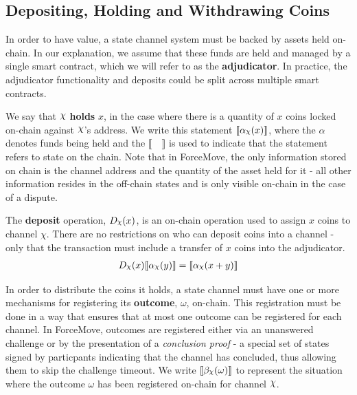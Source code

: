 \documentclass{article}
\DeclareRobustCommand{\rchi}{{\mathpalette\irchi\relax}}
\newcommand{\irchi}[2]{\raisebox{\depth}{$#1\chi$}} %
\theoremstyle{definition}
\newcommand{\adj}[1]{\llbracket #1 \rrbracket}
\begin{document}
\subsection{Depositing, Holding and Withdrawing Coins}

In order to have value, a state channel system must be backed by assets held on-chain.
In our explanation, we assume that these funds are held and managed by a single smart contract,
which we will refer to as the \textbf{adjudicator}.
In practice, the adjudicator functionality and deposits could be split across multiple smart contracts.

We say that $\rchi$ \textbf{holds} $x$, in the case where there is a quantity of $x$ coins
locked on-chain against $\rchi$'s address.
We write this statement $\adj{\alpha_\rchi(x)}$, where the $\alpha$ denotes funds being held
and the $\adj{\quad}$ is used to indicate that the statement refers to state on the chain.
Note that in ForceMove, the only information stored on chain is the channel address and the quantity of the asset held for it - all other information resides in the off-chain states and is only visible on-chain in the case of a dispute.


The \textbf{deposit} operation, $D_\rchi(x)$, is an on-chain operation used to assign $x$ coins to channel $\chi$.
There are no restrictions on who can deposit coins into a channel - only that the
transaction must include a transfer of $x$ coins into the adjudicator.
\begin{align*}
D_\rchi(x) \adj{\alpha_\rchi(y)} = \adj{\alpha_\rchi(x + y)}
\end{align*}

In order to distribute the coins it holds, a state channel must have one or more mechanisms for
registering its \textbf{outcome}, $\omega$, on-chain.
This registration must be done in a way that ensures that at most one outcome can be registered for each channel.
In ForceMove, outcomes are registered either via an unanswered challenge or by the presentation
of a \textit{conclusion proof} - a special set of states signed by particpants indicating
that the channel has concluded, thus allowing them to skip the challenge timeout.
We write  $\adj{\beta_\rchi(\omega)}$ to represent the situation where the outcome $\omega$
has been registered on-chain for channel $\rchi$.
\end{document}
